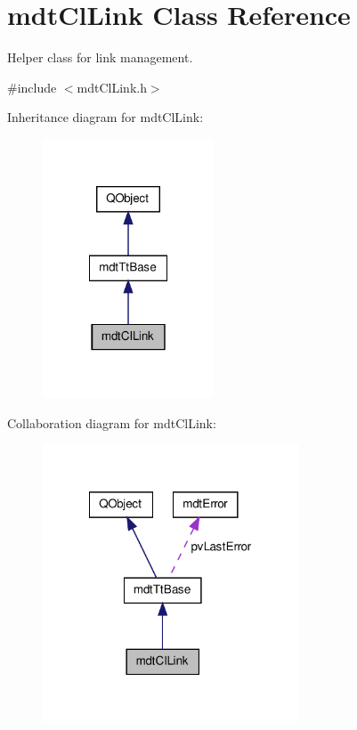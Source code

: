 \hypertarget{classmdt_cl_link}{\section{mdt\-Cl\-Link Class Reference}
\label{classmdt_cl_link}
}


Helper class for link management.  




{\ttfamily \#include $<$mdt\-Cl\-Link.\-h$>$}



Inheritance diagram for mdt\-Cl\-Link\-:\nopagebreak
\begin{figure}[H]
\begin{center}
\leavevmode
\includegraphics[width=144pt]{classmdt_cl_link__inherit__graph}
\end{center}
\end{figure}


Collaboration diagram for mdt\-Cl\-Link\-:\nopagebreak
\begin{figure}[H]
\begin{center}
\leavevmode
\includegraphics[width=216pt]{classmdt_cl_link__coll__graph}
\end{center}
\end{figure}

